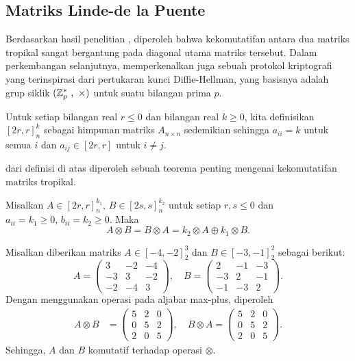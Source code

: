 \subsection{Matriks Linde-de la Puente}
Berdasarkan hasil penelitian \textcite{linde2014matricescommutinggivennormal}, diperoleh bahwa kekomutatifan antara dua matriks tropikal sangat bergantung pada diagonal utama matriks tersebut. Dalam perkembangan selanjutnya, \textcite{alhussaini2024securityinitialtropical} memperkenalkan juga sebuah protokol kriptografi yang terinspirasi dari pertukaran kunci Diffie-Hellman, yang basisnya adalah grup siklik $(\mathbb{Z}_p^*\ ,\ \times)$ untuk suatu bilangan prima $p$.
\begin{definisi}\label{def:matriks_ldlp}
  Untuk setiap bilangan real $r \leq 0$ dan bilangan real $k \geq 0$, kita definisikan
  $
    [2r, r]_{n}^{k}
  $
  sebagai himpunan matriks $A_{n\times n}$ sedemikian sehingga $a_{ii} = k$ untuk semua $i$ dan $a_{ij} \in [2r, r]$ untuk $i \neq j$.
\end{definisi}
dari definisi di atas diperoleh sebuah teorema penting mengenai kekomutatifan matriks tropikal.
\begin{teorema}\label{thm:komutatif_ldlp}
  Misalkan $A \in [2r, r]_{n}^{k_{1}}, \, B \in [2s, s]_{n}^{k_{2}}$ untuk setiap $r, s \leq 0$ dan $a_{ii} = k_{1} \geq 0, \, b_{ii} = k_{2} \geq 0$. Maka
  \[
    A \otimes B = B \otimes A = k_{2} \otimes A \oplus k_{1} \otimes B.
  \]
  \begin{contoh}
    Misalkan diberikan matriks $A\in [-4, -2]_{2}^{3}$ dan $B\in [-3, -1]_{2}^{2}$ sebagai berikut:
    \[
      A =
      \begin{pmatrix}
        3  & -2 & -4 \\
        -3 & 3  & -2 \\
        -2 & -4 & 3
      \end{pmatrix},
      \quad
      B =
      \begin{pmatrix}
        2  & -1 & -3 \\
        -3 & 2  & -1 \\
        -1 & -3 & 2
      \end{pmatrix}.
    \]
    Dengan menggunakan operasi pada aljabar max-plus, diperoleh
    \begin{align*}
      A \otimes B & =
      \begin{pmatrix}
        5 & 2 & 0 \\
        0 & 5 & 2 \\
        2 & 0 & 5
      \end{pmatrix},  \quad
      B \otimes A  =
      \begin{pmatrix}
        5 & 2 & 0 \\
        0 & 5 & 2 \\
        2 & 0 & 5
      \end{pmatrix}.
    \end{align*}
    Sehingga, $A$ dan $B$ komutatif terhadap operasi $\otimes$.
  \end{contoh}
\end{teorema}

